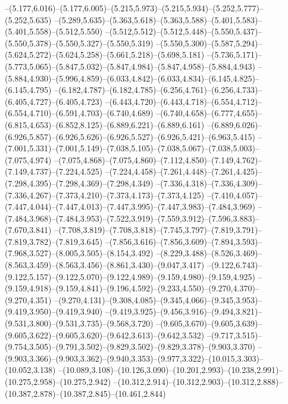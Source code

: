   --(5.177,6.016)--(5.177,6.005)--(5.215,5.973)--(5.215,5.934)--(5.252,5.777)--(5.252,5.635)%
  --(5.289,5.635)--(5.363,5.618)--(5.363,5.588)--(5.401,5.583)--(5.401,5.558)--(5.512,5.550)%
  --(5.512,5.512)--(5.512,5.448)--(5.550,5.437)--(5.550,5.378)--(5.550,5.327)--(5.550,5.319)%
  --(5.550,5.300)--(5.587,5.294)--(5.624,5.272)--(5.624,5.258)--(5.661,5.218)--(5.698,5.181)%
  --(5.736,5.171)--(5.773,5.065)--(5.847,5.032)--(5.847,4.984)--(5.847,4.958)--(5.884,4.943)%
  --(5.884,4.930)--(5.996,4.859)--(6.033,4.842)--(6.033,4.834)--(6.145,4.825)--(6.145,4.795)%
  --(6.182,4.787)--(6.182,4.785)--(6.256,4.761)--(6.256,4.733)--(6.405,4.727)--(6.405,4.723)%
  --(6.443,4.720)--(6.443,4.718)--(6.554,4.712)--(6.554,4.710)--(6.591,4.703)--(6.740,4.689)%
  --(6.740,4.658)--(6.777,4.655)--(6.815,4.653)--(6.852,8.125)--(6.889,6.221)--(6.889,6.161)%
  --(6.889,6.026)--(6.926,5.857)--(6.926,5.626)--(6.926,5.527)--(6.926,5.421)--(6.963,5.415)%
  --(7.001,5.331)--(7.001,5.149)--(7.038,5.105)--(7.038,5.067)--(7.038,5.003)--(7.075,4.974)%
  --(7.075,4.868)--(7.075,4.860)--(7.112,4.850)--(7.149,4.762)--(7.149,4.737)--(7.224,4.525)%
  --(7.224,4.458)--(7.261,4.448)--(7.261,4.425)--(7.298,4.395)--(7.298,4.369)--(7.298,4.349)%
  --(7.336,4.318)--(7.336,4.309)--(7.336,4.267)--(7.373,4.210)--(7.373,4.173)--(7.373,4.125)%
  --(7.410,4.057)--(7.447,4.044)--(7.447,4.013)--(7.447,3.995)--(7.447,3.983)--(7.484,3.969)%
  --(7.484,3.968)--(7.484,3.953)--(7.522,3.919)--(7.559,3.912)--(7.596,3.883)--(7.670,3.841)%
  --(7.708,3.819)--(7.708,3.818)--(7.745,3.797)--(7.819,3.791)--(7.819,3.782)--(7.819,3.645)%
  --(7.856,3.616)--(7.856,3.609)--(7.894,3.593)--(7.968,3.527)--(8.005,3.505)--(8.154,3.492)%
  --(8.229,3.488)--(8.526,3.469)--(8.563,3.459)--(8.563,3.456)--(8.861,3.430)--(9.047,3.417)%
  --(9.122,6.743)--(9.122,5.157)--(9.122,5.070)--(9.122,4.989)--(9.159,4.980)--(9.159,4.925)%
  --(9.159,4.918)--(9.159,4.841)--(9.196,4.592)--(9.233,4.550)--(9.270,4.370)--(9.270,4.351)%
  --(9.270,4.131)--(9.308,4.085)--(9.345,4.066)--(9.345,3.953)--(9.419,3.950)--(9.419,3.940)%
  --(9.419,3.925)--(9.456,3.916)--(9.494,3.821)--(9.531,3.800)--(9.531,3.735)--(9.568,3.720)%
  --(9.605,3.670)--(9.605,3.639)--(9.605,3.622)--(9.605,3.620)--(9.642,3.613)--(9.642,3.532)%
  --(9.717,3.515)--(9.754,3.505)--(9.791,3.502)--(9.829,3.502)--(9.829,3.378)--(9.903,3.370)%
  --(9.903,3.366)--(9.903,3.362)--(9.940,3.353)--(9.977,3.322)--(10.015,3.303)--(10.052,3.138)%
  --(10.089,3.108)--(10.126,3.090)--(10.201,2.993)--(10.238,2.991)--(10.275,2.958)--(10.275,2.942)%
  --(10.312,2.914)--(10.312,2.903)--(10.312,2.888)--(10.387,2.878)--(10.387,2.845)--(10.461,2.844)%
